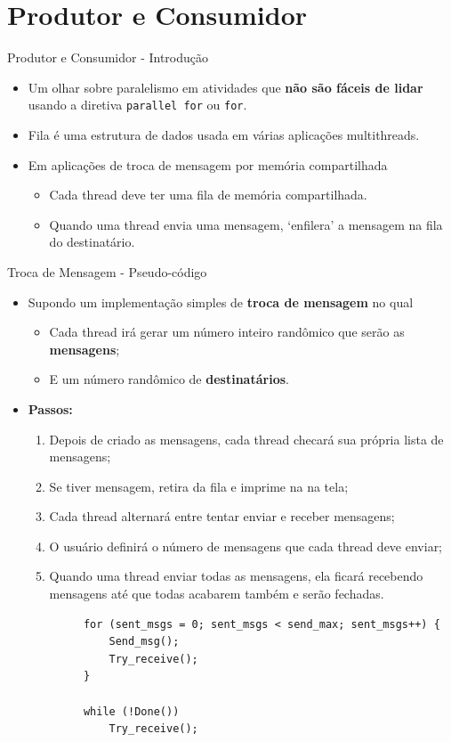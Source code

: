 \section{Produtor e Consumidor}
	\begin{frame}{Produtor e Consumidor - Introdução}
		\begin{itemize}
			\item Um olhar sobre paralelismo em atividades que \textbf{não são fáceis de lidar} usando a diretiva {\tt parallel for} ou {\tt for}.
			\bigskip
			\item Fila é uma estrutura de dados usada em várias aplicações multithreads.
			\item Em aplicações de troca de mensagem por memória compartilhada
			\begin{itemize}
				\item Cada thread deve ter uma fila de memória compartilhada.
				\item Quando uma thread envia uma mensagem, `enfilera' a mensagem na fila do destinatário.
			\end{itemize}
		\end{itemize}
	\end{frame}

	\begin{frame}[fragile]{Troca de Mensagem -  Pseudo-código}
		\begin{itemize}
			\item Supondo um implementação simples de \textbf{troca de mensagem} no qual
			\begin{itemize}
				\item Cada thread irá gerar um número inteiro randômico que serão as \textbf{mensagens};
				\item E um número randômico de \textbf{destinatários}.
			\end{itemize}
			\item{\bf Passos:}
			\begin{enumerate}
				\item Depois de criado as mensagens, cada thread checará sua própria lista de mensagens;
				\item Se tiver mensagem, retira da fila e imprime na na tela;
				\item Cada thread alternará entre tentar enviar e receber mensagens;
				\item O usuário definirá o número de mensagens que cada thread deve enviar;
				\item Quando uma thread enviar todas as mensagens, ela ficará recebendo mensagens até que todas acabarem também e serão fechadas.
			\end{enumerate}
		\end{itemize}
				\pause
		\begin{verbatim}
			for (sent_msgs = 0; sent_msgs < send_max; sent_msgs++) { 
				Send_msg();
				Try_receive();
			}
			
			while (!Done()) 
				Try_receive();
		\end{verbatim}
\end{frame}

